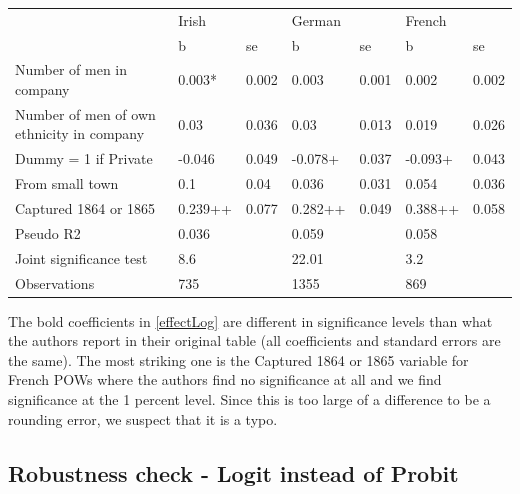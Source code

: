 \documentclass[a4paper]{report}\usepackage{graphicx, color}
\begin{document}
\begin{refsection}
\begin{table}
\begin{tabular}{lllllll}
                                          & \multicolumn{2}{l}{Irish} & \multicolumn{2}{l}{German} & \multicolumn{2}{l}{French} \\
                                          & b                         & se                         & b                          & se & b & se \\
Number of men in company                  & 0.003*                    & 0.002                      & 0.003                      & 0.001 & 0.002 & 0.002 \\
Number of men of own ethnicity in company & 0.03                      & 0.036                      & 0.03                       & 0.013 & 0.019 & 0.026 \\
Dummy = 1 if Private                      & -0.046                    & 0.049                      & -0.078+                    & 0.037 & -0.093+ & 0.043 \\
From small town                           & 0.1                       & 0.04                       & 0.036                      & 0.031 & 0.054 & 0.036 \\
Captured 1864 or 1865                     & 0.239++                   & 0.077                      & 0.282++                    & 0.049 & 0.388++ & 0.058 \\
Pseudo R2                                 & 0.036                     &                            & 0.059                      &  & 0.058 &  \\
Joint significance test                   & 8.6                       &                            & 22.01                      &  & 3.2 &  \\
Observations                              & 735                       &                            & 1355                       &  & 869 &  \\
\end{tabular}
\end{table}

The bold coefficients in \autoref{effectLog} are different in significance levels than what the authors report in their original table (all coefficients and standard errors are the same). The most striking one is the Captured 1864 or 1865 variable for French POWs where the authors find no significance at all and we find significance at the 1 percent level. Since this is too large of a difference to be a rounding error, we suspect that it is a typo.


\subsection{Robustness check - Logit instead of Probit}


\end{refsection}
\end{document}
